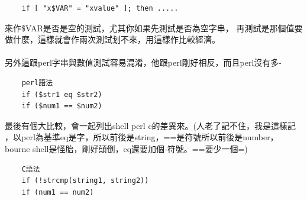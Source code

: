     \begin{verbatim}
    if [ "x$VAR" = "xvalue" ]; then .....
    \end{verbatim}
    來作\$VAR是否是空的測試，尤其你如果先測試是否為空字串，
    再測試是那個值要做什麼，這樣就會作兩次測試划不來，用這樣作比較經濟。
    \\\\
    另外這跟perl字串與數值測試容易混淆，他跟perl剛好相反，而且perl沒有多-
    \begin{verbatim}
    perl語法
    if ($str1 eq $str2)
    if ($num1 == $num2)
    \end{verbatim}
    最後有個大比較，會一起列出shell perl c的差異來。(人老了記不住，我是這樣記
    ，以perl為基準eq是字，所以前後是string，==是符號所以前後是number，
    bourne shell是怪胎，剛好顛倒，eq還要加個-符號。==要少一個=)
    \begin{verbatim}
    C語法
    if (!strcmp(string1, string2))
    if (num1 == num2)
    \end{verbatim}

